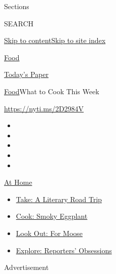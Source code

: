 Sections

SEARCH

\protect\hyperlink{site-content}{Skip to
content}\protect\hyperlink{site-index}{Skip to site index}

\href{https://www.nytimes3xbfgragh.onion/section/food}{Food}

\href{https://myaccount.nytimes3xbfgragh.onion/auth/login?response_type=cookie\&client_id=vi}{}

\href{https://www.nytimes3xbfgragh.onion/section/todayspaper}{Today's
Paper}

\href{/section/food}{Food}\textbar{}What to Cook This Week

\url{https://nyti.ms/2D2984V}

\begin{itemize}
\item
\item
\item
\item
\item
\end{itemize}

\href{https://www.nytimes3xbfgragh.onion/spotlight/at-home?action=click\&pgtype=Article\&state=default\&region=TOP_BANNER\&context=at_home_menu}{At
Home}

\begin{itemize}
\tightlist
\item
  \href{https://www.nytimes3xbfgragh.onion/2020/07/28/books/time-for-a-literary-road-trip.html?action=click\&pgtype=Article\&state=default\&region=TOP_BANNER\&context=at_home_menu}{Take:
  A Literary Road Trip}
\item
  \href{https://www.nytimes3xbfgragh.onion/2020/07/29/magazine/bored-with-your-home-cooking-some-smoky-eggplant-will-fix-that.html?action=click\&pgtype=Article\&state=default\&region=TOP_BANNER\&context=at_home_menu}{Cook:
  Smoky Eggplant}
\item
  \href{https://www.nytimes3xbfgragh.onion/2020/07/27/travel/moose-michigan-isle-royale.html?action=click\&pgtype=Article\&state=default\&region=TOP_BANNER\&context=at_home_menu}{Look
  Out: For Moose}
\item
  \href{https://www.nytimes3xbfgragh.onion/interactive/2020/at-home/even-more-reporters-editors-diaries-lists-recommendations.html?action=click\&pgtype=Article\&state=default\&region=TOP_BANNER\&context=at_home_menu}{Explore:
  Reporters' Obsessions}
\end{itemize}

Advertisement

